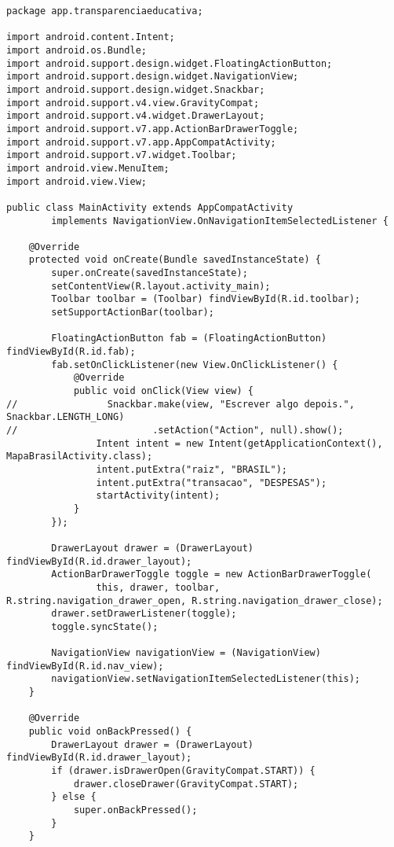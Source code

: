 \documentclass[12pt,a4paper]{article}
\begin{document}
\begin{lstlisting}[caption=./mobile/src/main/java/app/transparenciaeducativa/MainActivity.java]
package app.transparenciaeducativa;

import android.content.Intent;
import android.os.Bundle;
import android.support.design.widget.FloatingActionButton;
import android.support.design.widget.NavigationView;
import android.support.design.widget.Snackbar;
import android.support.v4.view.GravityCompat;
import android.support.v4.widget.DrawerLayout;
import android.support.v7.app.ActionBarDrawerToggle;
import android.support.v7.app.AppCompatActivity;
import android.support.v7.widget.Toolbar;
import android.view.MenuItem;
import android.view.View;

public class MainActivity extends AppCompatActivity
        implements NavigationView.OnNavigationItemSelectedListener {

    @Override
    protected void onCreate(Bundle savedInstanceState) {
        super.onCreate(savedInstanceState);
        setContentView(R.layout.activity_main);
        Toolbar toolbar = (Toolbar) findViewById(R.id.toolbar);
        setSupportActionBar(toolbar);

        FloatingActionButton fab = (FloatingActionButton) findViewById(R.id.fab);
        fab.setOnClickListener(new View.OnClickListener() {
            @Override
            public void onClick(View view) {
//                Snackbar.make(view, "Escrever algo depois.", Snackbar.LENGTH_LONG)
//                        .setAction("Action", null).show();
                Intent intent = new Intent(getApplicationContext(), MapaBrasilActivity.class);
                intent.putExtra("raiz", "BRASIL");
                intent.putExtra("transacao", "DESPESAS");
                startActivity(intent);
            }
        });

        DrawerLayout drawer = (DrawerLayout) findViewById(R.id.drawer_layout);
        ActionBarDrawerToggle toggle = new ActionBarDrawerToggle(
                this, drawer, toolbar, R.string.navigation_drawer_open, R.string.navigation_drawer_close);
        drawer.setDrawerListener(toggle);
        toggle.syncState();

        NavigationView navigationView = (NavigationView) findViewById(R.id.nav_view);
        navigationView.setNavigationItemSelectedListener(this);
    }

    @Override
    public void onBackPressed() {
        DrawerLayout drawer = (DrawerLayout) findViewById(R.id.drawer_layout);
        if (drawer.isDrawerOpen(GravityCompat.START)) {
            drawer.closeDrawer(GravityCompat.START);
        } else {
            super.onBackPressed();
        }
    }


\end{lstlisting}
\end{document}
